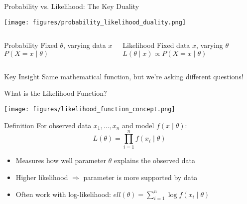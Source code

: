 \documentclass{beamer}
\def\ell{ell}%
\newcommand{\1}{\mathbf{1}}
\begin{document}
\begin{frame}{Probability vs. Likelihood: The Key Duality}
  \begin{center}
    \texttt{[image: figures/probability\_likelihood\_duality.png]}
  \end{center}
  \vspace{-0.7em}
  \begin{columns}[T]
  \begin{block}{Probability}
    \small Fixed \(\theta\), varying data \(x\)\\
    \(P(X = x \mid \theta)\)
  \end{block}
  \begin{block}{Likelihood}
    \small Fixed data \(x\), varying \(\theta\)\\
    \(L(\theta \mid x) \propto P(X = x \mid \theta)\)
  \end{block}
  \end{columns}
  \vspace{-0.1em}
  \begin{exampleblock}{Key Insight}
    \small Same mathematical function, but we're asking different questions!
  \end{exampleblock}
\end{frame}

\begin{frame}{What is the Likelihood Function?}
  \begin{center}
    \texttt{[image: figures/likelihood\_function\_concept.png]}
  \end{center}
  \vspace{-0.7em}
  \begin{block}{Definition}
    \footnotesize For observed data \(x_1, \ldots, x_n\) and model \(f(x \mid \theta)\):
    \[L(\theta) = \prod_{i=1}^n f(x_i \mid \theta)\]
  \end{block}
  \vspace{-0.2em}
  \begin{itemize}
    \footnotesize
    \item Measures how well parameter \(\theta\) explains the observed data
    \item Higher likelihood \(\Rightarrow\) parameter is more supported by data
    \item Often work with log-likelihood: \(\ell(\theta) = \sum_{i=1}^n \log f(x_i \mid \theta)\)
  \end{itemize}
\end{frame}
\end{document}
